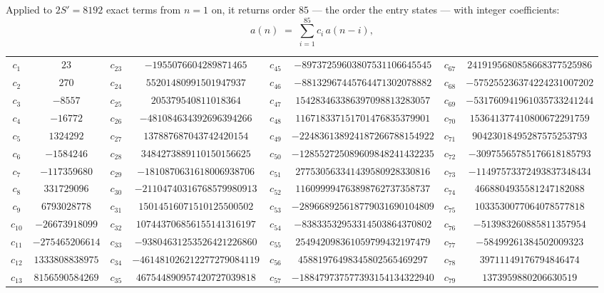 \documentclass[11pt,a4paper]{article}
\theoremstyle{plain}
\theoremstyle{definition}
\begin{document}
Applied to $2S'=8192$ exact terms from $n=1$ on, it returns order $85$ --- the
order the entry states --- with integer coefficients:
\[
a(n)\;=\;\sum_{i=1}^{85}c_i\,a(n-i),
\]
\begin{center}\small
\begin{tabular}{cccccccc}
$c_{1}$ & $23$ & $c_{23}$ & $-1955076604289871465$ & $c_{45}$ & $-89737259603807531106645545$ & $c_{67}$ & $2419195680858668377525986$ \\
$c_{2}$ & $270$ & $c_{24}$ & $55201480991501947937$ & $c_{46}$ & $-88132967445764471302078882$ & $c_{68}$ & $-575255236374224231007202$ \\
$c_{3}$ & $-8557$ & $c_{25}$ & $205379540811018364$ & $c_{47}$ & $154283463386397098813283057$ & $c_{69}$ & $-531760941961035733241244$ \\
$c_{4}$ & $-16772$ & $c_{26}$ & $-481084634392696394266$ & $c_{48}$ & $116718337151701476835379901$ & $c_{70}$ & $153641377410800672291759$ \\
$c_{5}$ & $1324292$ & $c_{27}$ & $137887687043742420154$ & $c_{49}$ & $-224836138924187266788154922$ & $c_{71}$ & $90423018495287575253793$ \\
$c_{6}$ & $-1584246$ & $c_{28}$ & $3484273889110150156625$ & $c_{50}$ & $-128552725089609848241432235$ & $c_{72}$ & $-30975565785176618185793$ \\
$c_{7}$ & $-117359680$ & $c_{29}$ & $-1810870631618006938706$ & $c_{51}$ & $277530563341439580928330816$ & $c_{73}$ & $-11497573372493837348434$ \\
$c_{8}$ & $331729096$ & $c_{30}$ & $-21104740316768579980913$ & $c_{52}$ & $116099994763898762737358737$ & $c_{74}$ & $4668804935581247182088$ \\
$c_{9}$ & $6793028778$ & $c_{31}$ & $15014516071510125500502$ & $c_{53}$ & $-289668925618779031690104809$ & $c_{75}$ & $1033530077064078577818$ \\
$c_{10}$ & $-26673918099$ & $c_{32}$ & $107443706856155141316197$ & $c_{54}$ & $-83833532953314503864370802$ & $c_{76}$ & $-513983260885811357954$ \\
$c_{11}$ & $-275465206614$ & $c_{33}$ & $-93804631253526421226860$ & $c_{55}$ & $254942098361059799432197479$ & $c_{77}$ & $-58499261384502009323$ \\
$c_{12}$ & $1333808838975$ & $c_{34}$ & $-461481026212277279084119$ & $c_{56}$ & $45881976498345802565469297$ & $c_{78}$ & $39711149176794846474$ \\
$c_{13}$ & $8156590584269$ & $c_{35}$ & $467544890957420727039818$ & $c_{57}$ & $-188479737577393154134322940$ & $c_{79}$ & $1373959880206630519$ \\

\end{tabular}
\end{center}
\end{document}
